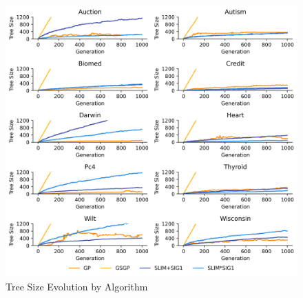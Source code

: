 
    \begin{figure}[H]
    \centering
    \includegraphics[width=\linewidth]{../Latex/Chapters/Figures/Results/RQ_Comparison_tree_size_evolution.png}
    \caption{Tree Size Evolution by Algorithm}
    \label{fig:RQ_Comparison_tree_size_evolution}
    \end{figure}
    